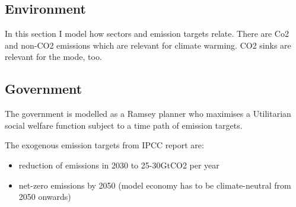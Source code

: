 \subsection{Environment}
In this section I model how sectors and emission targets relate.
There are Co2 and non-CO2 emissions which are relevant for climate warming. 
CO2 sinks are relevant for the mode, too. 


\begin{comment}
The environment in the literature

In \cite{Acemoglu2012TheChange}

\begin{itemize}
	\item quality of nature, $S_t$, and irreversibility
	\begin{align*}
	S_{t}= -\xi Y_{nt}\pmb{{-\kappa \xi Y_{st}}}+(1+\delta)S_{t-1} & \hspace{3mm} \text{if}\  S_{t}\in[0,\bar{S}]\\
	S_{t+s}=0 \ \forall s>0& \hspace{3mm}  \text{if} \ S_{t}<0
	\end{align*}
	\item environmental disaster: $S_t<0$
	\begin{align*}
	\underset{S\rightarrow0}{lim} u(C,h;S)=-\infty; 
	\hspace{5mm} 
	\underset{S\rightarrow0}{lim}\frac{\partial u(C,h;S)}{\partial S}=\infty
	\end{align*}
	\item stock of natural resources
	\begin{align*}
	Q_{t+1}=Q_t-R_{nt}\pmb{{-R_{st}}}
	\end{align*}
\end{itemize}

content...
\end{comment}

\subsection{Government}
The government is modelled as a Ramsey planner who maximises a Utilitarian social welfare function subject to a time path of emission targets.

\noindent
The exogenous emission targets from IPCC report \citep{Rogelj2018MitigationDevelopment.} are:
\begin{itemize}
\item reduction of emissions in 2030 to 25-30GtCO2 per year 
\item net-zero emissions by 2050 (model economy has to be climate-neutral from 2050 onwards)

\end{itemize}
